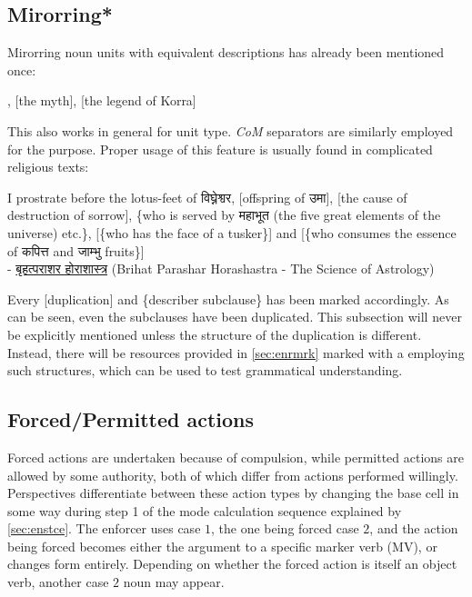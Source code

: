 \subsection{Mirorring*}
Mirorring noun units with equivalent descriptions has already been mentioned once:
\begin{example}
    , [the myth], [the legend of Korra]
\end{example}
This also works in general for  unit type. \textit{CoM} separators are similarly employed for the purpose. Proper usage of this feature is usually found in complicated religious texts:
\begin{example}
    I prostrate before the lotus-feet of \textsanskrit{विघ्नेश्वर}, [offspring of \textsanskrit{उमा}], [the cause of destruction of sorrow], \{who is served by \textsanskrit{महाभूत} (the five great elements of the universe) etc.\}, [\{who has the face of a tusker\}] and [\{who consumes the essence of \textsanskrit{कपित्त} and \textsanskrit{जाम्भु} fruits\}]\\ - \href{https://vedpuran.net/wp-content/uploads/2021/04/brihat_parashara_hora_shastra_english_v.pdf}{\textsanskrit{बृहत्पराशर होराशास्त्र}} (Brihat Parashar Horashastra - The Science of Astrology)
\end{example}
Every [duplication] and \{describer subclause\} has been marked accordingly. As can be seen, even the subclauses have been duplicated. This subsection will never be explicitly mentioned unless the structure of the duplication is different. Instead, there will be   resources provided in \autoref{sec:enrmrk} marked with a \bt{+} employing such structures, which can be used to test grammatical understanding.
\subsection{Forced/Permitted actions}
Forced actions are undertaken because of compulsion, while permitted actions are allowed by some authority, both of which differ from  actions performed willingly.  Perspectives  differentiate between these  action types by changing the base cell in some way during step 1 of the mode calculation sequence explained by \autoref{sec:enstce}. The enforcer uses case $1$, the one being forced case $2$, and the action being forced becomes either the argument to a specific marker verb (MV), or changes form entirely. Depending on whether the forced action is itself an object verb, another case $2$ noun may appear. 


